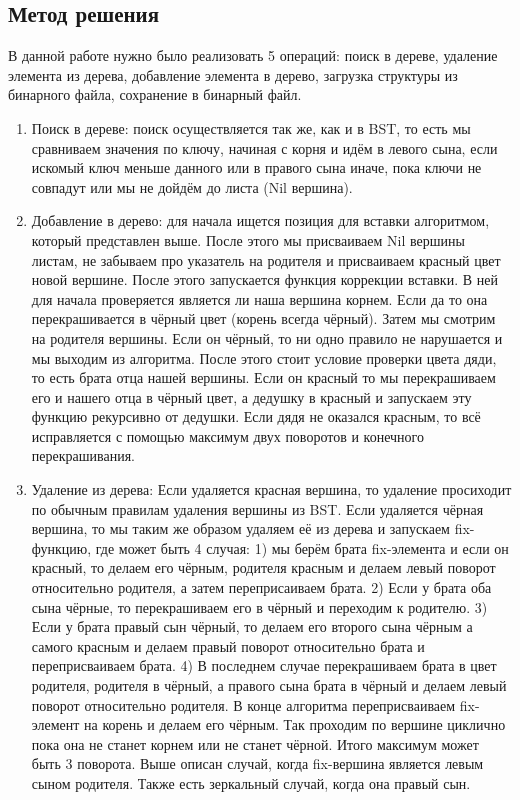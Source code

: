 \documentclass[12pt]{article}
\begin{document}
\subsection*{Метод решения}

В данной работе нужно было реализовать 5 операций: поиск в дереве, удаление элемента из дерева, добавление элемента в дерево, загрузка структуры  из бинарного файла, сохранение в бинарный файл.

\begin{enumerate}
\item Поиск в дереве: поиск осуществляется так же, как и в BST, то есть мы сравниваем значения по ключу, начиная с корня и идём в левого сына, если искомый ключ меньше данного или в правого сына иначе, пока ключи не совпадут или мы не дойдём до листа (Nil вершина).
\item Добавление в дерево: для начала ищется позиция для вставки алгоритмом, который представлен выше. После этого мы присваиваем Nil вершины листам, не забываем про указатель на родителя и присваиваем красный цвет новой вершине. После этого запускается функция коррекции вставки. В ней для начала проверяется является ли наша вершина корнем. Если да то она перекрашивается в чёрный цвет (корень всегда чёрный). Затем мы смотрим на родителя вершины. Если он чёрный, то ни одно правило не нарушается и мы выходим из алгоритма. После этого стоит условие проверки цвета дяди, то есть брата отца нашей вершины. Если он красный то мы перекрашиваем его и нашего отца в чёрный цвет, а дедушку в красный и запускаем эту функцию рекурсивно от дедушки. Если дядя не оказался красным, то всё исправляется с помощью максимум двух поворотов и конечного перекрашивания.
\item Удаление из дерева: Если удаляется красная вершина, то удаление просиходит по обычным правилам удаления вершины из BST. Если удаляется чёрная вершина, то мы таким же образом удаляем её из дерева и запускаем fix-функцию, где может быть 4 случая: 1) мы берём брата fix-элемента и если он красный, то делаем его чёрным, родителя красным и делаем левый поворот относительно родителя, а затем переприсаиваем брата. 2) Если у брата оба сына чёрные, то перекрашиваем его в чёрный и переходим к родителю. 3) Если у брата правый сын чёрный, то делаем его второго сына чёрным а самого красным и делаем правый поворот относительно брата и переприсваиваем брата. 4) В последнем случае перекрашиваем брата в цвет родителя, родителя в чёрный, а правого сына брата в чёрный и делаем левый поворот относительно родителя. В конце алгоритма переприсваиваем fix-элемент на корень и делаем его чёрным. Так проходим по вершине циклично пока она не станет корнем или не станет чёрной. Итого максимум может быть 3 поворота. Выше описан случай, когда fix-вершина является левым сыном родителя. Также есть зеркальный случай, когда она правый сын.

\end{enumerate}
\end{document}
